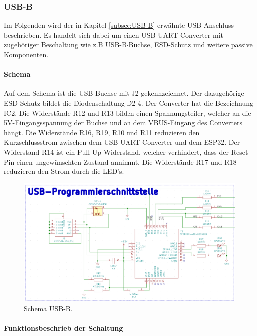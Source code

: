 \subsubsection{USB-B}\label{subsubsec:USB-B}

Im Folgenden wird der in Kapitel \ref{subsec:USB-B} erwähnte USB-Anschluss beschrieben. Es handelt sich dabei um einen USB-UART-Converter mit zugehöriger Beschaltung wie z.B USB-B-Buchse, ESD-Schutz und weitere passive Komponenten.

\paragraph{Schema}\mbox{}

Auf dem Schema ist die USB-Buchse mit J2 gekennzeichnet. Der dazugehörige ESD-Schutz bildet die Diodenschaltung D2-4. Der Converter hat die Bezeichnung IC2. Die Widerstände R12 und R13 bilden einen Spannungsteiler, welcher an die 5V-Eingangsspannung der Buchse und an dem VBUS-Eingang des Converters hängt. Die Widerstände R16, R19, R10 und R11 reduzieren den Kurzschlussstrom zwischen dem USB-UART-Converter und dem ESP32. Der Widerstand R14 ist ein Pull-Up Widerstand, welcher verhindert, dass der Reset-Pin einen ungewünschten Zustand annimmt. Die Widerstände R17 und R18 reduzieren den Strom durch die LED's.

\begin{figure}[h!]
	\centering
	\includegraphics[width=1\textwidth]{graphics/Schema_USB_B}
	\caption{Schema USB-B.}
	\label{fig:Schema_USB_B}
\end{figure}

\newpage

\paragraph{Funktionsbeschrieb der Schaltung}\mbox{}

